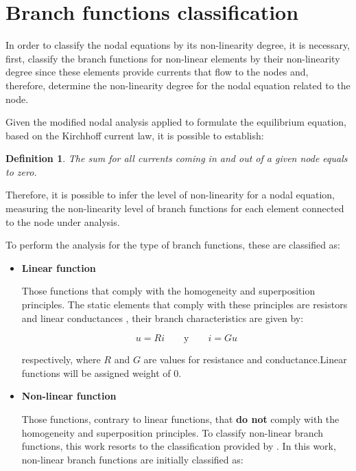 \documentclass[conference,letterpaper,onecolumn,11pt]{IEEEtran}
\newtheorem{Theod}{{\bf Definition}}
\begin{document}
\section{Branch functions classification}
\label{cfr}

In order to classify the nodal equations by its non-linearity degree, it is necessary, first, classify the branch functions for non-linear elements by their non-linearity degree since these elements provide currents that flow to the nodes and, therefore, determine the non-linearity degree for the nodal equation related to the node.

Given the modified nodal analysis applied to formulate the equilibrium equation, based on the Kirchhoff current law, it is possible to establish:

\begin{Theod}
The sum for all currents coming in and out of a given node equals to zero.
\end{Theod}

Therefore, it is possible to infer the level of non-linearity for a nodal equation, measuring the non-linearity level of branch functions for each element connected to the node under analysis.

To perform the analysis for the type of branch functions, these are classified as:

\begin{itemize}
\item {\bf Linear function}\hfill \par
Those functions that comply with the homogeneity and superposition principles. The static elements that comply with these principles are resistors and linear conductances \cite{Vlach_book}, their branch characteristics are given by:

\begin{displaymath}
u= R i \qquad \mbox{y} \qquad i=G u
\end{displaymath}

respectively, where $R$ and $G$ are values for resistance and conductance.Linear functions will be assigned weight of 0.

\item {\bf Non-linear function}\hfill \par
Those functions, contrary to linear functions, that {\bf do not} comply with the homogeneity and superposition principles. To classify non-linear branch functions, this work resorts to the classification provided by \cite{cont_leu11}. In this work, non-linear branch functions are initially classified as:

\end{itemize}
\end{document}
